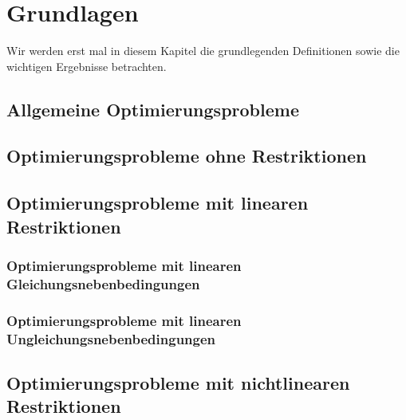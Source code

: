 \chapter{Grundlagen}

Wir werden erst mal in diesem Kapitel die grundlegenden Definitionen
sowie die wichtigen Ergebnisse betrachten.

\section{Allgemeine Optimierungsprobleme}


\section{Optimierungsprobleme ohne Restriktionen}


\section{Optimierungsprobleme mit linearen Restriktionen}

  \subsection{Optimierungsprobleme mit linearen Gleichungsnebenbedingungen}
  

  \subsection{Optimierungsprobleme mit linearen Ungleichungsnebenbedingungen}
  

\section{Optimierungsprobleme mit nichtlinearen Restriktionen}


